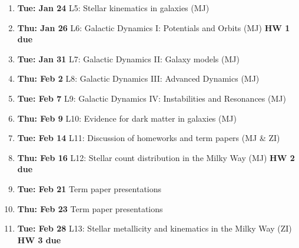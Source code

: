 \documentclass[10pt]{article}
\begin{document}
\begin{enumerate}
  \item {\bf Tue: Jan 24}  L5: Stellar kinematics in galaxies (MJ)
  \item {\bf Thu: Jan 26}  L6: Galactic Dynamics I: Potentials and Orbits (MJ) {\bf HW 1 due}
  \item {\bf Tue: Jan 31}  L7: Galactic Dynamics II: Galaxy models (MJ) 
  \item {\bf Thu: Feb 2}   L8: Galactic Dynamics III: Advanced Dynamics (MJ)
  \item {\bf Tue: Feb 7}   L9: Galactic Dynamics IV: Instabilities and Resonances (MJ)
  \item {\bf Thu: Feb 9}   L10: Evidence for dark matter in galaxies (MJ)
  \item {\bf Tue: Feb 14}  L11: Discussion of homeworks and term papers (MJ \& ZI) 
  \item {\bf Thu: Feb 16}  L12: Stellar count distribution in the Milky Way (MJ)  {\bf HW 2 due}
 \item {\bf Tue: Feb 21}  Term paper presentations
  \item {\bf Thu: Feb 23}  Term paper presentations 
  \item {\bf Tue: Feb 28}  L13: Stellar metallicity and kinematics in the Milky Way (ZI)  {\bf HW 3 due}

\end{enumerate}
\end{document}
